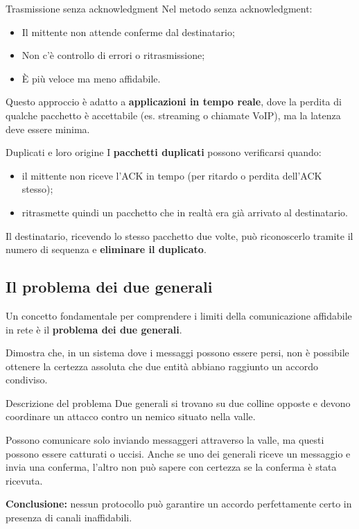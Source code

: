 \documentclass[a4paper,12pt]{report}
\begin{document}
\begin{notebox}{Trasmissione senza acknowledgment}
Nel metodo senza acknowledgment:
\begin{itemize}
    \item Il mittente non attende conferme dal destinatario;
    \item Non c’è controllo di errori o ritrasmissione;
    \item È più veloce ma meno affidabile.
\end{itemize}

Questo approccio è adatto a \textbf{applicazioni in tempo reale}, dove la perdita di qualche pacchetto è accettabile (es. streaming o chiamate VoIP), ma la latenza deve essere minima.
\end{notebox}

\begin{esempiobox}{Duplicati e loro origine}
I \textbf{pacchetti duplicati} possono verificarsi quando:
\begin{itemize}
    \item il mittente non riceve l’ACK in tempo (per ritardo o perdita dell’ACK stesso);
    \item ritrasmette quindi un pacchetto che in realtà era già arrivato al destinatario.
\end{itemize}

Il destinatario, ricevendo lo stesso pacchetto due volte, può riconoscerlo tramite il numero di sequenza e \textbf{eliminare il duplicato}.
\end{esempiobox}



\vspace{2cm}
\subsection{Il problema dei due generali}


Un concetto fondamentale per comprendere i limiti della comunicazione affidabile in rete è il \textbf{problema dei due generali}.  

Dimostra che, in un sistema dove i messaggi possono essere persi, non è possibile ottenere la certezza assoluta che due entità abbiano raggiunto un accordo condiviso.



\begin{esempiobox}{Descrizione del problema}
Due generali si trovano su due colline opposte e devono coordinare un attacco contro un nemico situato nella valle.  

Possono comunicare solo inviando messaggeri attraverso la valle, ma questi possono essere catturati o uccisi.  
Anche se uno dei generali riceve un messaggio e invia una conferma, l’altro non può sapere con certezza se la conferma è stata ricevuta.  

\textbf{Conclusione:} nessun protocollo può garantire un accordo perfettamente certo in presenza di canali inaffidabili.
\end{esempiobox}
\end{document}
